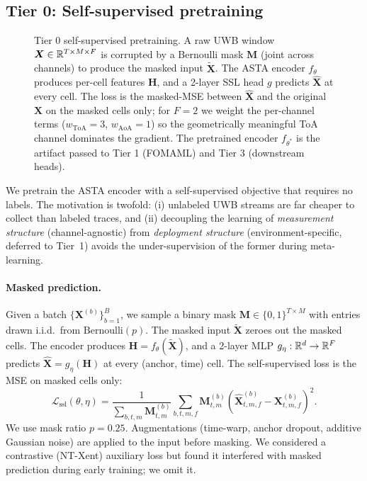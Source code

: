 \subsection{Tier 0: Self-supervised pretraining}
\label{sec:tier0}

\begin{figure}[t]
  \centering
  
  \caption{Tier 0 self-supervised pretraining. A raw UWB window
  $\bm{X} \in \mathbb{R}^{T \times M \times F}$ is corrupted by a Bernoulli
  mask $\bm{M}$ (joint across channels) to produce the masked
  input $\tilde{\bm{X}}$. The ASTA encoder $f_\theta$ produces
  per-cell features $\bm{H}$, and a 2-layer SSL head $g$ predicts
  $\hat{\bm{X}}$ at every cell. The loss is the masked-MSE between
  $\hat{\bm{X}}$ and the original $\bm{X}$ on the masked cells only;
  for $F=2$ we weight the per-channel terms ($w_{\mathrm{ToA}}{=}3$,
  $w_{\mathrm{AoA}}{=}1$) so the geometrically meaningful ToA channel
  dominates the gradient. The pretrained encoder $f_{\theta^*}$ is
  the artifact passed to Tier 1 (FOMAML) and Tier 3 (downstream heads).}
  \label{fig:tier0}
\end{figure}

We pretrain the ASTA encoder with a self-supervised objective
that requires no labels. The motivation is twofold: (i) unlabeled
UWB streams are far cheaper to collect than labeled traces, and
(ii) decoupling the learning of \emph{measurement structure}
(channel-agnostic) from \emph{deployment structure}
(environment-specific, deferred to Tier~1) avoids the
under-supervision of the former during meta-learning.

\paragraph{Masked prediction.}
Given a batch $\{\bm{X}^{(b)}\}_{b=1}^{B}$, we sample a binary mask
$\bm{M} \in \{0,1\}^{T \times M}$ with entries drawn i.i.d.\ from
$\mathrm{Bernoulli}(p)$. The masked input $\tilde{\bm{X}}$
zeroes out the masked cells. The encoder produces
$\bm{H} = f_\theta(\tilde{\bm{X}})$, and a 2-layer MLP
$g_\eta : \mathbb{R}^d \to \mathbb{R}^F$ predicts
$\hat{\bm{X}} = g_\eta(\bm{H})$ at every (anchor, time) cell.
The self-supervised loss is the MSE on masked cells only:
\begin{equation}
  \mathcal{L}_{\mathrm{ssl}}(\theta, \eta)
  = \frac{1}{\sum_{b,t,m} \bm{M}^{(b)}_{t,m}}
    \sum_{b,t,m,f} \bm{M}^{(b)}_{t,m}
    \left( \hat{\bm{X}}^{(b)}_{t,m,f} - \bm{X}^{(b)}_{t,m,f} \right)^2.
  \label{eq:ssl}
\end{equation}
We use mask ratio $p = 0.25$. Augmentations (time-warp, anchor
dropout, additive Gaussian noise) are applied to the input before
masking. We considered a contrastive (NT-Xent) auxiliary loss
\cite{simclr2020} but found it interfered with masked prediction
during early training; we omit it.

